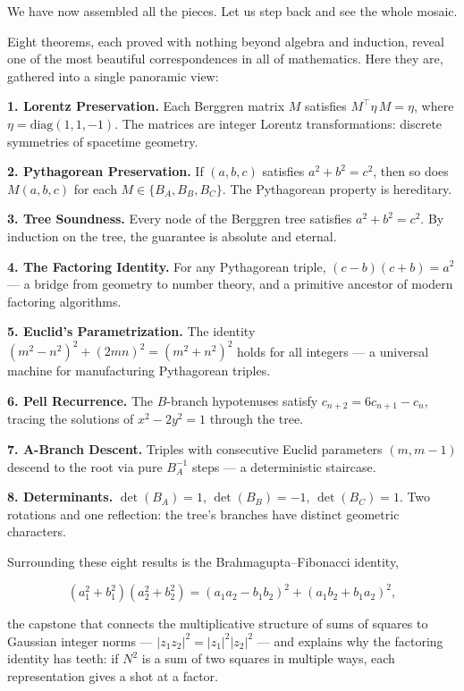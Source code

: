 \documentclass[11pt,openany]{book}
\theoremstyle{definition}
\theoremstyle{plain}
\theoremstyle{remark}
\begin{document}
We have now assembled all the pieces. Let us step back and see the whole mosaic.

Eight theorems, each proved with nothing beyond algebra and induction, reveal one of the most beautiful correspondences in all of mathematics. Here they are, gathered into a single panoramic view:

\textbf{1. Lorentz Preservation.} Each Berggren matrix $M$ satisfies $M^\top \eta\, M = \eta$, where $\eta = \mathrm{diag}(1, 1, -1)$. The matrices are integer Lorentz transformations: discrete symmetries of spacetime geometry.

\textbf{2. Pythagorean Preservation.} If $(a, b, c)$ satisfies $a^2 + b^2 = c^2$, then so does $M(a, b, c)$ for each $M \in \{B_A, B_B, B_C\}$. The Pythagorean property is hereditary.

\textbf{3. Tree Soundness.} Every node of the Berggren tree satisfies $a^2 + b^2 = c^2$. By induction on the tree, the guarantee is absolute and eternal.

\textbf{4. The Factoring Identity.} For any Pythagorean triple, $(c - b)(c + b) = a^2$ — a bridge from geometry to number theory, and a primitive ancestor of modern factoring algorithms.

\textbf{5. Euclid's Parametrization.} The identity $(m^2 - n^2)^2 + (2mn)^2 = (m^2 + n^2)^2$ holds for all integers — a universal machine for manufacturing Pythagorean triples.

\textbf{6. Pell Recurrence.} The $B$-branch hypotenuses satisfy $c_{n+2} = 6c_{n+1} - c_n$, tracing the solutions of $x^2 - 2y^2 = 1$ through the tree.

\textbf{7. A-Branch Descent.} Triples with consecutive Euclid parameters $(m, m-1)$ descend to the root via pure $B_A^{-1}$ steps — a deterministic staircase.

\textbf{8. Determinants.} $\det(B_A) = 1$, $\det(B_B) = -1$, $\det(B_C) = 1$. Two rotations and one reflection: the tree's branches have distinct geometric characters.

Surrounding these eight results is the Brahmagupta–Fibonacci identity,

$$(a_1^2 + b_1^2)(a_2^2 + b_2^2) = (a_1 a_2 - b_1 b_2)^2 + (a_1 b_2 + b_1 a_2)^2,$$

the capstone that connects the multiplicative structure of sums of squares to Gaussian integer norms — $|z_1 z_2|^2 = |z_1|^2 |z_2|^2$ — and explains why the factoring identity has teeth: if $N^2$ is a sum of two squares in multiple ways, each representation gives a shot at a factor.
\end{document}
